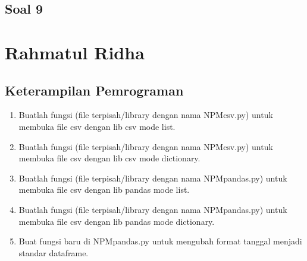\subsection{Soal 9}



\section{Rahmatul Ridha}
\subsection{Keterampilan Pemrograman}
\begin{enumerate}
	\item Buatlah  fungsi  (file  terpisah/library  dengan  nama  NPMcsv.py)  untuk  membuka file csv dengan lib csv mode list.
	
	
	
	\item Buatlah  fungsi  (file  terpisah/library  dengan  nama  NPMcsv.py)  untuk  membuka file csv dengan lib csv mode dictionary.
	
	
	
	\item Buatlah fungsi (file terpisah/library dengan nama NPMpandas.py) untuk membuka file csv dengan lib pandas mode list.
	
	
	
	\item Buatlah fungsi (file terpisah/library dengan nama NPMpandas.py) untuk membuka file csv dengan lib pandas mode dictionary.
	
	
	
	\item  Buat fungsi baru di NPMpandas.py untuk mengubah format tanggal menjadi standar dataframe.
	
	
	

\end{enumerate}
